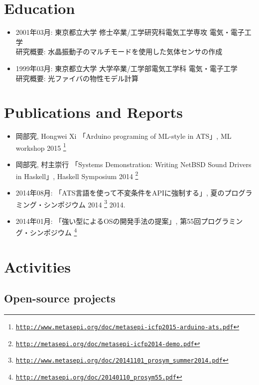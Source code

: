 \documentclass[letterpaper]{article}
\begin{document}
\section*{Education}

\begin{itemize}
  \item 2001年03月: 東京都立大学 修士卒業/工学研究科電気工学専攻 電気・電子工学 \\
    研究概要: 水晶振動子のマルチモードを使用した気体センサの作成
  \item 1999年03月: 東京都立大学 大学卒業/工学部電気工学科 電気・電子工学 \\
    研究概要: 光ファイバの物性モデル計算
\end{itemize}

\section*{Publications and Reports}

\begin{itemize}
  \item 岡部究, Hongwei Xi 「Arduino programing of ML-style in ATS」, ML workshop 2015
    \footnote{\href{http://www.metasepi.org/doc/metasepi-icfp2015-arduino-ats.pdf}{\tt http://www.metasepi.org/doc/metasepi-icfp2015-arduino-ats.pdf}}
  \item 岡部究, 村主崇行 「Systems Demonstration: Writing NetBSD Sound Drivers in Haskell」, Haskell Symposium 2014
    \footnote{\href{http://metasepi.org/doc/metasepi-icfp2014-demo.pdf}{\tt http://metasepi.org/doc/metasepi-icfp2014-demo.pdf}}
  \item 2014年08月: 「ATS言語を使って不変条件をAPIに強制する」, 夏のプログラミング・シンポジウム 2014
    \footnote{\href{http://www.metasepi.org/doc/20141101\_prosym\_summer2014.pdf}{\tt http://www.metasepi.org/doc/20141101\_prosym\_summer2014.pdf}}  2014.
  \item 2014年01月: 「強い型によるOSの開発手法の提案」, 第55回プログラミング・シンポジウム
    \footnote{\href{http://metasepi.org/doc/20140110\_prosym55.pdf}{\tt http://metasepi.org/doc/20140110\_prosym55.pdf}}
\end{itemize}

\section*{Activities}

\subsection*{Open-source projects}
\end{document}
